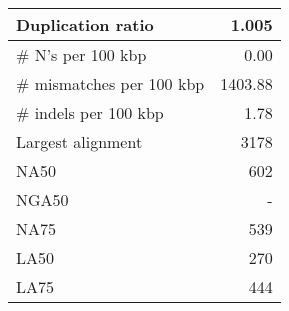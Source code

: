 \documentclass[12pt,a4paper]{article}
\begin{document}
\begin{table}[ht]
\begin{center}
\begin{tabular}{|l*{1}{|r}|}
Duplication ratio & 1.005 \\ \hline
\# N's per 100 kbp & 0.00 \\ \hline
\# mismatches per 100 kbp & 1403.88 \\ \hline
\# indels per 100 kbp & 1.78 \\ \hline
Largest alignment & 3178 \\ \hline
NA50 & 602 \\ \hline
NGA50 & - \\ \hline
NA75 & 539 \\ \hline
LA50 & 270 \\ \hline
LA75 & 444 \\ \hline
\end{tabular}
\end{center}
\end{table}
\end{document}
